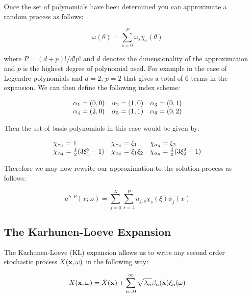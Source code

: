 Once the set of polynomials have been determined you can approximate a random
process as follows:

\begin{equation}
    \omega(\theta) = \sum_{s=0}^P\omega_s\chi_s(\theta)
\end{equation}

where $P = (d + p)!/d!p!$ and $d$ denotes the dimensionality of the
approximation and $p$ is the highest degree of polynomial used. For example in
the case of Legendre polynomials and $d=2$, $p=2$ that gives a total of 6
terms in the expansion. We can then define the following index scheme:

\begin{equation}
  \begin{array}{c c c }
    \alpha_1 = (0,0) & \alpha_2 = (1,0) & \alpha_3 = (0,1) \\
    \alpha_4 = (2,0) & \alpha_5 = (1,1) & \alpha_6 = (0,2)
  \end{array}
\end{equation}

Then the set of basis polynomials in this case would be given by:

\begin{equation}
  \begin{array}{l l l}
    \chi_{\alpha_1} = 1 & \chi_{\alpha_2} = \xi_1 & \chi_{\alpha_3} = \xi_2 \\
    \chi_{\alpha_4} = \frac{1}{2}(3\xi_1^2 - 1) &
    \chi_{\alpha_5} = \xi_1\xi_2 &
    \chi_{\alpha_6} = \frac{1}{2}(3\xi_2^2 - 1)
  \end{array}
\end{equation}


Therefore we may now rewrite our approximation to the solution process
 as follows:

\begin{equation}\label{eq:oned-stochastic-uhp}
    u^{h,P}(x;\omega) = \sum_{j=0}^N\sum_{s=1}^Pu_{j,s}\chi_s(\xi)\phi_j(x)
\end{equation}

\subsection{The Karhunen-Loeve Expansion}

The Karhunen-Loeve (KL) expansion allows us to write any second order
stochastic process $X(\mathbf{x},\omega)$ in the following way:

\begin{equation}
    X(\mathbf{x}, \omega) = \bar{X}(\mathbf{x})
    + \sum_{n = 0}^\infty\sqrt{\lambda_n}\beta_n(\mathbf{x})\xi_n(\omega)
\end{equation}

